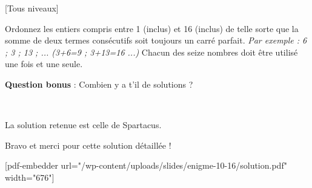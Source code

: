 
%
[Tous niveaux]

\begin{center}
\end{center}

Ordonnez les entiers compris entre 1 (inclus) et 16 (inclus) de telle sorte que la somme de deux termes consécutifs soit toujours un carré parfait.
\textit{Par exemple : 6 ; 3 ; 13 ; ... (3+6=9 ; 3+13=16 ...)}
Chacun des seize nombres doit être utilisé une fois et une seule.
\par
\textbf{Question bonus} : Combien y a t'il de solutions ?
\par
~
\begin{solution}
     La solution retenue est celle de Spartacus. 
\par
Bravo et merci pour cette solution détaillée !
     \par
{}%
     [pdf-embedder url="/wp-content/uploads/slides/enigme-10-16/solution.pdf" width="676"]
\end{solution}

